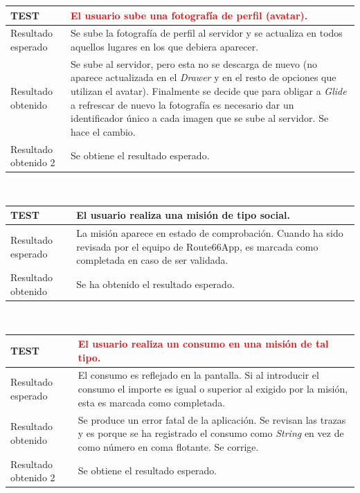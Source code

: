 \documentclass[twoside]{report}
\newcommand\addrow[2]{#1 &#2\\ }
\newcommand\addheading[2]{#1 &#2\\ \hline}
\newcommand\tabularhead{\begin{tabular}{lp{0.7\textwidth}}
\hline
}
\newenvironment{test}{\tabularhead}
{\hline\end{tabular}}
\begin{document}
\vspace{0.5cm}

\begin{test}
  \addheading{\textbf{TEST\arabic{test}}}{\textcolor{red}{El usuario sube una fotografía de perfil (avatar).}} 
  \addrow{Resultado esperado}{Se sube la fotografía de perfil al servidor y se actualiza en todos aquellos lugares en los que debiera aparecer.}
  \addrow{Resultado obtenido}{Se sube al servidor, pero esta no se descarga de nuevo (no aparece actualizada en el \textit{Drawer} y en el resto de opciones que utilizan el avatar). Finalmente se decide que para obligar a \textit{Glide} a refrescar de nuevo la fotografía es necesario dar un identificador único a cada imagen que se sube al servidor. Se hace el cambio.}
   \addrow{Resultado obtenido 2}{Se obtiene el resultado esperado.}
\end{test}\\

\vspace{0.5cm}


\begin{test}
  \addheading{\textbf{TEST\arabic{test}}}{El usuario realiza una misión de tipo social.} 
  \addrow{Resultado esperado}{La misión aparece en estado de comprobación. Cuando ha sido revisada por el equipo de Route66App, es marcada como completada en caso de ser validada.}
  \addrow{Resultado obtenido}{Se ha obtenido el resultado esperado.}
\end{test}\\

\vspace{0.5cm}

\begin{test}
  \addheading{\textbf{TEST\arabic{test}}}{\textcolor{red}{El usuario realiza un consumo en una misión de tal tipo.}} 
  \addrow{Resultado esperado}{El consumo es reflejado en la pantalla. Si al introducir el consumo el importe es igual o superior al exigido por la misión, esta es marcada como completada.}
  \addrow{Resultado obtenido}{Se produce un error fatal de la aplicación. Se revisan las trazas y es porque se ha registrado el consumo como \textit{String} en vez de como número en coma flotante. Se corrige.}
   \addrow{Resultado obtenido 2}{Se obtiene el resultado esperado.}
\end{test}\\

\vspace{0.5cm}
\end{document}
